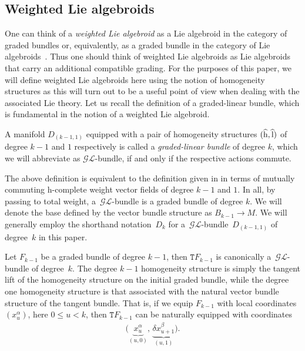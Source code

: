 \documentclass[pdftex]{sigma}
\newcommand{\rmh}{\textnormal{h}}
\newcommand{\rml}{\textnormal{l}}
\def\sT{{\mathtt T}}
\numberwithin{equation}{section}
\begin{document}
\subsection{Weighted Lie algebroids}
 One can think of  a \emph{weighted Lie algebroid} as a Lie algebroid in the category of graded bundles or, equivalently, as a graded bundle in the category of Lie algebroids~\cite{Bruce:2014}. Thus one should think of weighted Lie algebroids as Lie algebroids that carry an additional compatible grading. For the purposes of this paper, we will def\/ine weighted Lie algebroids here using the notion of homogeneity structures as this will turn out to be a useful point of view when dealing with the associated Lie theory.  Let us recall the def\/inition of a graded-linear bundle, which is fundamental in the notion of a weighted Lie algebroid.

\begin{Definition}
A manifold $D_{(k-1, 1)}$ equipped with a pair of homogeneity structures $(\widehat{\rmh}, \widehat{\rml})$ of degree $k-1$ and $1$ respectively is called a \emph{graded-linear bundle} of degree $k$, which we will abbreviate as $\mathcal{GL}$-bundle, if and only if the respective actions commute.
\end{Definition}



The above def\/inition is equivalent to the def\/inition given in \cite{Bruce:2014} in terms of mutually commuting h-complete weight vector f\/ields of degree $k-1$ and $1$. In all, by passing to total weight, a~$\mathcal{GL}$-bundle is a graded bundle of degree $k$. We will denote the base def\/ined by the vector bundle structure as $B_{k-1} \rightarrow M$. We will  generally employ the shorthand notation~$D_{k}$ for a~$\mathcal{GL}$-bundle~$D_{(k-1,1)}$ of degree~$k$ in this paper.


\begin{Example}
Let $F_{k-1}$ be a graded bundle of degree $k-1$, then $\sT F_{k-1}$ is canonically a~$\mathcal{GL}$-bundle of degree~$k$. The degree $k-1$ homogeneity structure is simply the tangent lift of the homogeneity structure on the initial graded bundle, while the degree one homogeneity structure is that associated with the natural vector bundle structure of the tangent bundle. That is, if we equip $F_{k-1}$ with local coordinates $(x^{\alpha}_{u})$, here $0 \leq u < k$, then  $\sT F_{k-1}$ can be naturally equipped with coordinates
\begin{gather*}
\big(\underbrace{x^{\alpha}_{u}}_{(u,0)}, \, \underbrace{\delta x_{u+1}^{\beta}}_{(u,1)}\big).
\end{gather*}
\end{Example}
\end{document}
